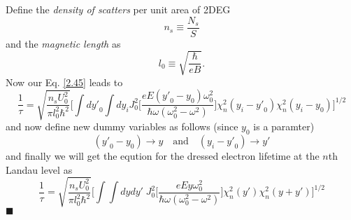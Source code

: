 Define the \textit{density of scatters} per unit area of 2DEG
\begin{equation} \label{2.46}
    n_s \equiv \frac{N_s}{S}
\end{equation}
and the \textit{magnetic length} as
\begin{equation} \label{2.47}
    l_0 \equiv \sqrt{\frac{\hbar}{eB}}.
\end{equation}
Now our Eq. \eqref{2.45} leads to
\begin{equation} \label{2.48}
    \frac{1}{\tau} =
    \sqrt{
    \frac{n_sU_0^2}{\pi l_0^2 \hbar^2}}
    \bigg[
    \int d{y'}_0
    \int dy_i
    J_0^2\bigg[\frac{eE({y'}_0 - y_0)\omega_0^2}{\hbar\omega(\omega_0^2-\omega^2)}\bigg]
      \chi_n^2 (y_i - {y'}_0)
      \chi_n^2 (y_i - {y}_0)
    \bigg]^{1/2}
\end{equation}
and now define new dummy variables as follows (since $y_0$ is a paramter)
\begin{equation} \label{2.49}
    ({y'}_0 - y_0) \rightarrow  y  \quad \text{and} \quad
    ({y}_i- {y'}_0) \rightarrow y'
\end{equation}
and finally we will get the eqution for the dressed electron lifetime at the $n$th Landau level as
\begin{equation} \label{2.50}
    \frac{1}{\tau} =
    \sqrt{
    \frac{n_sU_0^2}{\pi l_0^2 \hbar^2}}
    \bigg[
    \int \int  dy dy'\;
    J_0^2\bigg[\frac{eEy\omega_0^2}{\hbar\omega(\omega_0^2-\omega^2)}\bigg]
      \chi_n^2 (y')
      \chi_n^2 (y+y')
    \bigg]^{1/2}
\end{equation}
\hfill$\blacksquare$
